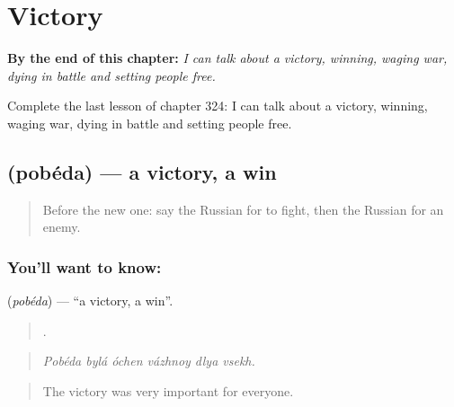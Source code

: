 
\chapter{Victory}
\label{ch:ru-victory}

\begin{chapteropening}
\textbf{By the end of this chapter:} \emph{I can talk about a victory, winning, waging war, dying in battle and setting people free.}

Complete the last lesson of chapter 324: I can talk about a victory, winning, waging war, dying in battle and setting people free.
\end{chapteropening}

\section[\texorpdfstring{\ru{победа} (pobéda)}{победа (pobéda)}]{ (pobéda) — a victory, a win}

\label{lesson:RU-C324-pobeda}



\begin{quote}
Before the new one: say the Russian for to fight, then the Russian for an enemy.
\end{quote}

\subsection*{You'll want to know: }
\textbf{} (\emph{pobéda}) — \textquotedblleft{}a victory, a win\textquotedblright{}.

\begin{quote}
     .
\end{quote}

\begin{quote}
\emph{Pobéda bylá óchen vázhnoy dlya vsekh.}
\end{quote}

\begin{quote}
The victory was very important for everyone.
\end{quote}

